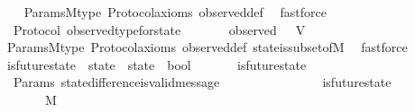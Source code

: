 \begin{isabellebody}
%
\isadelimproof
\ \ %
\endisadelimproof
%
\isatagproof
{}\isamarkupfalse%
\ Params{\isachardot}M{\isacharunderscore}type\ Protocol{\isacharunderscore}axioms\ observed{\isacharunderscore}def\ \isamarkupfalse%
\ fastforce%
\endisatagproof
{\isafoldproof}%
%
\isadelimproof
\isanewline
%
\endisadelimproof
\isanewline
{}\isamarkupfalse%
\ {\isacharparenleft}\ Protocol{\isacharparenright}\ observed{\isacharunderscore}type{\isacharunderscore}for{\isacharunderscore}state\ {\isacharcolon}\isanewline
\ \ {\isachardoublequoteopen}{\isasymforall}\ {\isasymsigma}\ {\isasymin}\ {\isasymSigma}{\isachardot}\ observed\ {\isasymsigma}\ {\isasymsubseteq}\ V{\isachardoublequoteclose}\isanewline
%
\isadelimproof
\ \ %
\endisadelimproof
%
\isatagproof
{}\isamarkupfalse%
\ Params{\isachardot}M{\isacharunderscore}type\ Protocol{\isacharunderscore}axioms\ observed{\isacharunderscore}def\ state{\isacharunderscore}is{\isacharunderscore}subset{\isacharunderscore}of{\isacharunderscore}M\ \isamarkupfalse%
\ fastforce%
\endisatagproof
{\isafoldproof}%
%
\isadelimproof
\isanewline
%
\endisadelimproof
\isanewline
\isanewline
{}\isamarkupfalse%
\ is{\isacharunderscore}future{\isacharunderscore}state\ {\isacharcolon}{\isacharcolon}\ {\isachardoublequoteopen}{\isacharparenleft}state\ {\isacharasterisk}\ state{\isacharparenright}\ {\isasymRightarrow}\ bool{\isachardoublequoteclose}\isanewline
\ \ \isanewline
\ \ \ \ {\isachardoublequoteopen}is{\isacharunderscore}future{\isacharunderscore}state\ {\isacharparenleft}{\isasymsigma}{}{\isacharcomma}\ {\isasymsigma}{}{\isacharparenright}\ {\isacharequal}\ {\isacharparenleft}{\isasymsigma}{}\ {\isasymsubseteq}\ {\isasymsigma}{}{\isacharparenright}{\isachardoublequoteclose}\isanewline
\isanewline
{}\isamarkupfalse%
\ {\isacharparenleft}\ Params{\isacharparenright}\ state{\isacharunderscore}difference{\isacharunderscore}is{\isacharunderscore}valid{\isacharunderscore}message\ {\isacharcolon}\isanewline
\ \ {\isachardoublequoteopen}{\isasymforall}\ {\isasymsigma}\ {\isasymsigma}{\isacharprime}{\isachardot}\ {\isasymsigma}\ {\isasymin}\ {\isasymSigma}\ {\isasymand}\ {\isasymsigma}{\isacharprime}\ {\isasymin}\ {\isasymSigma}\isanewline
\ \ {\isasymlongrightarrow}\ is{\isacharunderscore}future{\isacharunderscore}state{\isacharparenleft}{\isasymsigma}{\isacharcomma}\ {\isasymsigma}{\isacharprime}{\isacharparenright}\isanewline
\ \ {\isasymlongrightarrow}\ {\isasymsigma}{\isacharprime}\ {\isacharminus}\ {\isasymsigma}\ {\isasymsubseteq}\ M{\isachardoublequoteclose}\isanewline

\end{isabellebody}

